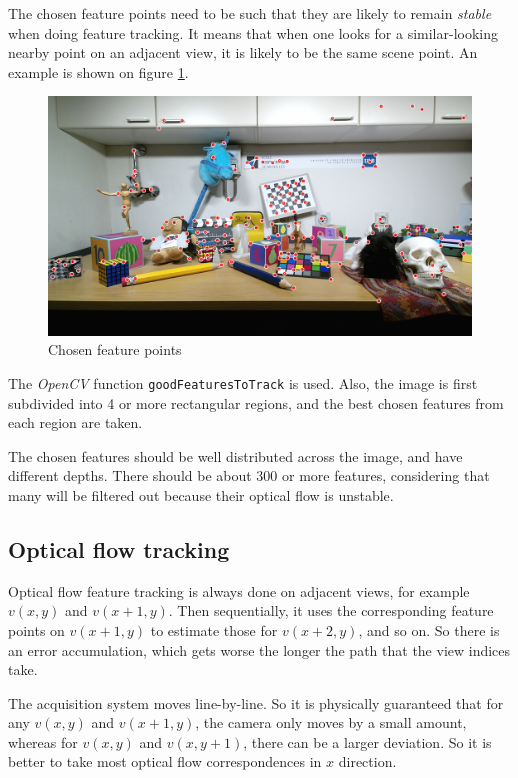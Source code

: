 \documentclass[11pt]{scrreprt}
\begin{document}
The chosen feature points need to be such that they are likely to remain \emph{stable} when doing feature tracking. It means that when one looks for a similar-looking nearby point on an adjacent view, it is likely to be the same scene point. An example is shown on figure \ref{fig:choosefeatures}.

\begin{figure}
\includegraphics[width=\textwidth]{choosefeatures.png}
\caption{Chosen feature points}
\label{fig:choosefeatures}
\end{figure}

The \emph{OpenCV} function \texttt{goodFeaturesToTrack} is used. Also, the image is first subdivided into 4 or more rectangular regions, and the best chosen features from each region are taken.

The chosen features should be well distributed across the image, and have different depths. There should be about $300$ or more features, considering that many will be filtered out because their optical flow is unstable.


\subsection{Optical flow tracking}
Optical flow feature tracking is always done on adjacent views, for example $v(x,y)$ and $v(x+1,y)$. Then sequentially, it uses the corresponding feature points on $v(x+1,y)$ to estimate those for $v(x+2,y)$, and so on. So there is an error accumulation, which gets worse the longer the path that the view indices take.

The acquisition system moves line-by-line. So it is physically guaranteed that for any $v(x,y)$ and $v(x+1,y)$, the camera only moves by a small amount, whereas for $v(x,y)$ and $v(x,y+1)$, there can be a larger deviation. So it is better to take most optical flow correspondences in $x$ direction.
\end{document}
